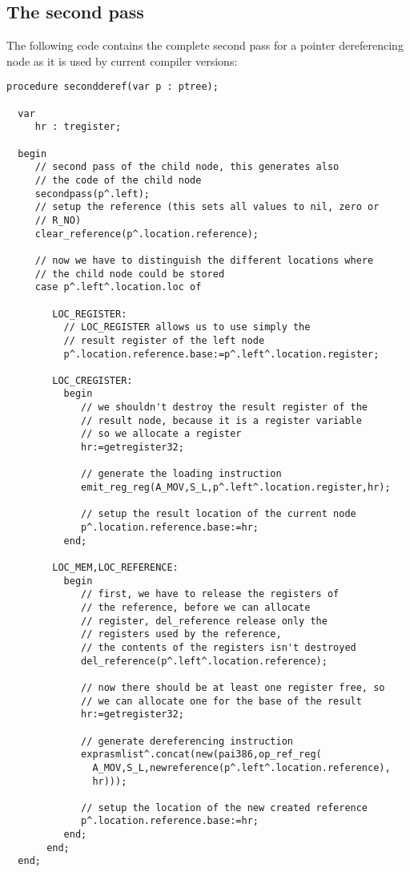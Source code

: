 \subsection{The second pass}

The following code contains the complete second pass for
a pointer dereferencing node as it is used by current
compiler versions:

\begin{verbatim}
procedure secondderef(var p : ptree);

  var
     hr : tregister;

  begin
     // second pass of the child node, this generates also
     // the code of the child node
     secondpass(p^.left);
     // setup the reference (this sets all values to nil, zero or
     // R_NO)
     clear_reference(p^.location.reference);

     // now we have to distinguish the different locations where
     // the child node could be stored
     case p^.left^.location.loc of

        LOC_REGISTER:
          // LOC_REGISTER allows us to use simply the
          // result register of the left node
          p^.location.reference.base:=p^.left^.location.register;

        LOC_CREGISTER:
          begin
             // we shouldn't destroy the result register of the
             // result node, because it is a register variable
             // so we allocate a register
             hr:=getregister32;

             // generate the loading instruction
             emit_reg_reg(A_MOV,S_L,p^.left^.location.register,hr);

             // setup the result location of the current node
             p^.location.reference.base:=hr;
          end;

        LOC_MEM,LOC_REFERENCE:
          begin
             // first, we have to release the registers of
             // the reference, before we can allocate
             // register, del_reference release only the
             // registers used by the reference,
             // the contents of the registers isn't destroyed
             del_reference(p^.left^.location.reference);

             // now there should be at least one register free, so
             // we can allocate one for the base of the result
             hr:=getregister32;

             // generate dereferencing instruction
             exprasmlist^.concat(new(pai386,op_ref_reg(
               A_MOV,S_L,newreference(p^.left^.location.reference),
               hr)));

             // setup the location of the new created reference
             p^.location.reference.base:=hr;
          end;
       end;
  end;
\end{verbatim}

